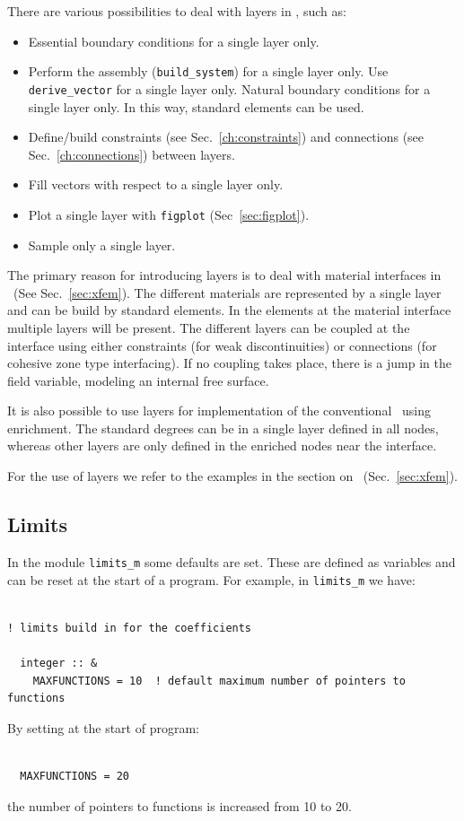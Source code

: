 There are various possibilities to deal with layers in \tfem, such as:
\begin{itemize}
   \item Essential boundary conditions for a single layer only.
   \item Perform the assembly (\texttt{build\_system}) for a single layer only.
         Use \texttt{derive\_vector} for a single layer only.
         Natural boundary conditions for a single layer only.
         In this way, standard elements can be used.
   \item Define/build constraints (see Sec.~\ref{ch:constraints})
         and connections (see Sec.~\ref{ch:connections}) between layers.
   \item Fill vectors with respect to a single layer only.
   \item Plot a single layer with \texttt{figplot} (Sec~\ref{sec:figplot}).
   \item Sample only a single layer.
\end{itemize}

The primary reason for introducing layers is to deal with material interfaces
in \xfem\ (See Sec.~\ref{sec:xfem}).
The different materials are represented by a single layer and can be build by
standard elements. In the elements at the material interface multiple layers
will be present. The different layers can be coupled at the interface using
either constraints (for weak discontinuities) or connections (for cohesive zone
type interfacing). If no coupling takes place, there is a jump in the field
variable, modeling an internal free surface.

It is also possible to use layers for implementation of the conventional \xfem\
using enrichment. The standard degrees can be in a single layer defined in
all nodes, whereas other layers are only defined in the enriched nodes near the
interface.

For the use of layers we refer to the examples in the section on \xfem\
(Sec.~\ref{sec:xfem}).

\subsection{Limits}
\label{sec:limits}

In the module \texttt{limits\_m} some defaults are set. These are defined as
variables and can be reset at the start of a program. For example, in
\texttt{limits\_m} we have:
   \begin{verbatim}

! limits build in for the coefficients

  integer :: &
    MAXFUNCTIONS = 10  ! default maximum number of pointers to functions
   \end{verbatim}
By setting at the start of program:
   \begin{verbatim}

  MAXFUNCTIONS = 20 
   \end{verbatim}
the number of pointers to functions is increased from 10 to 20.

